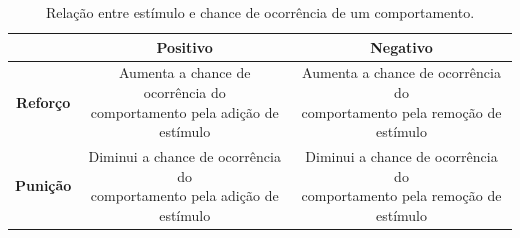 \documentclass{article}
\begin{document}
                \begin{table}[ht]
                    \centering
                    \caption{Relação entre estímulo e chance de ocorrência de um comportamento.}
                    \label{tab:reforco-punicao}
                    \begin{tabular}{|c|c|c|}
                        \hline
                         & \textbf{Positivo} & \textbf{Negativo} \\
                        \hline
                        \textbf{Reforço} & \makecell{Aumenta a chance de ocorrência do \\ comportamento pela adição de estímulo} & \makecell{Aumenta a chance de ocorrência do \\ comportamento pela remoção de estímulo} \\
                        \hline
                        \textbf{Punição} & \makecell{Diminui a chance de ocorrência do \\ comportamento pela adição de estímulo} & \makecell{Diminui a chance de ocorrência do \\ comportamento pela remoção de estímulo} \\
                        \hline
                    \end{tabular}
                \end{table}
            
\end{document}
